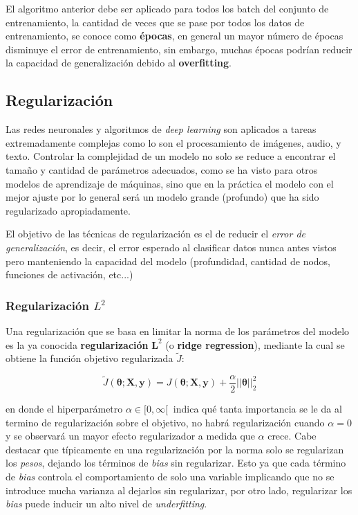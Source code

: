 \begin{remark}
	El algoritmo anterior debe ser aplicado para todos los batch del conjunto de entrenamiento, la cantidad de veces que se pase por todos los datos de entrenamiento, se conoce como \textbf{épocas}, en general un mayor número de épocas disminuye el error de entrenamiento, sin embargo, muchas épocas podrían reducir la capacidad de generalización debido al \textbf{overfitting}.	
\end{remark}

\subsection{Regularización}

Las redes neuronales y algoritmos de \textit{deep learning} son aplicados a tareas extremadamente complejas como lo son el procesamiento de im\'agenes, audio, y texto. Controlar la complejidad de un modelo no solo se reduce a encontrar el tamaño y cantidad de parámetros adecuados, como se ha visto para otros modelos de aprendizaje de m\'aquinas, sino que en la pr\'actica el modelo con el mejor ajuste por lo general ser\'a un modelo grande (profundo) que ha sido regularizado apropiadamente. 

El objetivo de las técnicas de regularización es el de reducir el \textit{error de generalización}, es decir, el error esperado al clasificar datos nunca antes vistos pero manteniendo la capacidad del modelo (profundidad, cantidad de nodos, funciones de activación, etc...)

\subsubsection{Regularización ${L}^{2}$}

Una regularizaci\'on que se basa en limitar la norma de los parámetros del modelo es la ya conocida \textbf{regularizaci\'on} $\bm{L}^{2}$ (o \textbf{ridge regression}), mediante la cual se obtiene la funci\'on objetivo regularizada $\tilde{J}$:

\begin{equation}
\tilde{J}(\bm{\theta};\bm{X},\bm{y}) = J(\bm{\theta};\bm{X},\bm{y}) + \frac{\alpha}{2}||\bm{\theta}||^{2}_{2}
\end{equation}

en donde el hiperpar\'ametro $\alpha \in [0,\infty[\ $ indica qué tanta importancia se le da al termino de regularización sobre el objetivo, no habrá regularizaci\'on cuando $\alpha = 0$ y se observará un mayor efecto regularizador a medida que $\alpha$ crece. Cabe destacar que t\'ipicamente en una regularizaci\'on por la norma solo se regularizan los \textit{pesos}, dejando los t\'erminos de \textit{bias} sin regularizar. Esto ya que cada t\'ermino de \textit{bias} controla el comportamiento de solo una variable implicando que no se introduce mucha varianza al dejarlos sin regularizar, por otro lado, regularizar los \textit{bias} puede inducir un alto nivel de \textit{underfitting}.

